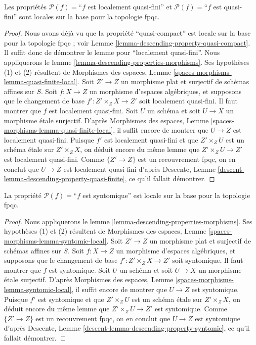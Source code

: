 \begin{lemma}
\label{lemma-descending-property-quasi-finite}
Les propriétés
$\mathcal{P}(f) =$``$f$ est localement quasi-fini''
et
$\mathcal{P}(f) =$``$f$ est quasi-fini''
sont locales sur la base pour la topologie fpqc.
\end{lemma}

\begin{proof}
Nous avons déjà vu que la propriété ``quasi-compact'' est locale sur la base pour la topologie fpqc ; voir
Lemme \ref{lemma-descending-property-quasi-compact}. Il suffit donc
de démontrer le lemme pour ``localement quasi-fini''. Nous appliquerons le
lemme \ref{lemma-descending-properties-morphisms}.
Ses hypothèses (1) et (2) résultent de
Morphismes des espaces,
Lemme \ref{spaces-morphisms-lemma-quasi-finite-local}.
Soit $Z' \to Z$ un morphisme plat et surjectif de schémas affines sur $S$.
Soit $f : X \to Z$ un morphisme d'espaces algébriques, et supposons
que le changement de base $f' : Z' \times_Z X \to Z'$ soit localement quasi-fini.
Il faut montrer que $f$ est localement quasi-fini. Soit $U$ un schéma
et soit $U \to X$ un morphisme étale surjectif. D'après
Morphismes des espaces,
Lemme \ref{spaces-morphisms-lemma-quasi-finite-local},
il suffit encore de montrer que $U \to Z$ est localement quasi-fini.
Puisque $f'$ est localement quasi-fini et que $Z' \times_Z U$ est un
schéma étale sur $Z' \times_Z X$, on déduit encore du même lemme que
$Z' \times_Z U \to Z'$ est localement quasi-fini.
Comme $\{Z' \to Z\}$ est un recouvrement fpqc, on en conclut que
$U \to Z$ est localement quasi-fini d'après
Descente, Lemme \ref{descent-lemma-descending-property-quasi-finite},
ce qu'il fallait démontrer.
\end{proof}

\begin{lemma}
\label{lemma-descending-property-syntomic}
La propriété $\mathcal{P}(f) =$``$f$ est syntomique''
est locale sur la base pour la topologie fpqc.
\end{lemma}

\begin{proof}
Nous appliquerons le
lemme \ref{lemma-descending-properties-morphisms}.
Ses hypothèses (1) et (2) résultent de
Morphismes des espaces,
Lemme \ref{spaces-morphisms-lemma-syntomic-local}.
Soit $Z' \to Z$ un morphisme plat et surjectif de schémas affines sur $S$.
Soit $f : X \to Z$ un morphisme d'espaces algébriques, et supposons
que le changement de base $f' : Z' \times_Z X \to Z'$ soit syntomique.
Il faut montrer que $f$ est syntomique. Soit $U$ un schéma
et soit $U \to X$ un morphisme étale surjectif. D'après
Morphismes des espaces,
Lemme \ref{spaces-morphisms-lemma-syntomic-local},
il suffit encore de montrer que $U \to Z$ est syntomique.
Puisque $f'$ est syntomique et que $Z' \times_Z U$ est un
schéma étale sur $Z' \times_Z X$, on déduit encore du même lemme que
$Z' \times_Z U \to Z'$ est syntomique.
Comme $\{Z' \to Z\}$ est un recouvrement fpqc, on en conclut que
$U \to Z$ est syntomique d'après
Descente, Lemme \ref{descent-lemma-descending-property-syntomic},
ce qu'il fallait démontrer.
\end{proof}

